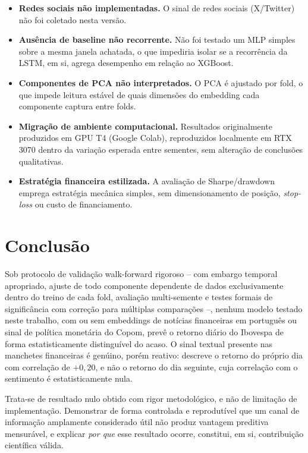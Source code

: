 \documentclass[conference]{IEEEtran}
\begin{document}
\begin{itemize}
\item \textbf{Redes sociais n\~ao implementadas.} O sinal de redes sociais (X/Twitter) n\~ao foi coletado nesta vers\~ao.
\item \textbf{Aus\^encia de baseline n\~ao recorrente.} N\~ao foi testado um MLP simples sobre a mesma janela achatada, o que impediria isolar se a recorr\^encia da LSTM, em si, agrega desempenho em rela\c{c}\~ao ao XGBoost.
\item \textbf{Componentes de PCA n\~ao interpretados.} O PCA \'e ajustado por fold, o que impede leitura est\'avel de quais dimens\~oes do embedding cada componente captura entre folds.
\item \textbf{Migra\c{c}\~ao de ambiente computacional.} Resultados originalmente produzidos em GPU T4 (Google Colab), reproduzidos localmente em RTX 3070 dentro da varia\c{c}\~ao esperada entre sementes, sem altera\c{c}\~ao de conclus\~oes qualitativas.
\item \textbf{Estrat\'egia financeira estilizada.} A avalia\c{c}\~ao de Sharpe/drawdown emprega estrat\'egia mec\^anica simples, sem dimensionamento de posi\c{c}\~ao, \emph{stop-loss} ou custo de financiamento.
\end{itemize}

\section{Conclus\~ao}

Sob protocolo de valida\c{c}\~ao walk-forward rigoroso -- com embargo temporal apropriado, ajuste de todo componente dependente de dados exclusivamente dentro do treino de cada fold, avalia\c{c}\~ao multi-semente e testes formais de signific\^ancia com corre\c{c}\~ao para m\'ultiplas compara\c{c}\~oes --, nenhum modelo testado neste trabalho, com ou sem embeddings de not\'icias financeiras em portugu\^es ou sinal de pol\'itica monet\'aria do Copom, prev\^e o retorno di\'ario do Ibovespa de forma estatisticamente distingu\'ivel do acaso. O sinal textual presente nas manchetes financeiras \'e gen\'uino, por\'em reativo: descreve o retorno do pr\'oprio dia com correla\c{c}\~ao de $+0{,}20$, e n\~ao o retorno do dia seguinte, cuja correla\c{c}\~ao com o sentimento \'e estatisticamente nula.

Trata-se de resultado nulo obtido com rigor metodol\'ogico, e n\~ao de limita\c{c}\~ao de implementa\c{c}\~ao. Demonstrar de forma controlada e reprodut\'ivel que um canal de informa\c{c}\~ao amplamente considerado \'util n\~ao produz vantagem preditiva mensur\'avel, e explicar \emph{por que} esse resultado ocorre, constitui, em si, contribui\c{c}\~ao cient\'ifica v\'alida.
\end{document}
